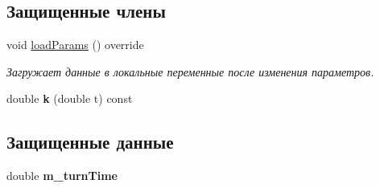\subsection*{Защищенные члены}
\begin{DoxyCompactItemize}
\item 
void \hyperlink{class_tasks_1_1_continuous_discrete_1_1_landing_linear_a1845731f06868b6a22cbd7184e0358ff}{load\+Params} () override\hypertarget{class_tasks_1_1_continuous_discrete_1_1_landing_linear_a1845731f06868b6a22cbd7184e0358ff}{}\label{class_tasks_1_1_continuous_discrete_1_1_landing_linear_a1845731f06868b6a22cbd7184e0358ff}

\begin{DoxyCompactList}\small\item\em Загружает данные в локальные переменные после изменения параметров. \end{DoxyCompactList}\item 
double {\bfseries k} (double t) const \hypertarget{class_tasks_1_1_continuous_discrete_1_1_landing_linear_a6fc909fe9a58a038714138081a246295}{}\label{class_tasks_1_1_continuous_discrete_1_1_landing_linear_a6fc909fe9a58a038714138081a246295}

\end{DoxyCompactItemize}
\subsection*{Защищенные данные}
\begin{DoxyCompactItemize}
\item 
double {\bfseries m\+\_\+turn\+Time}\hypertarget{class_tasks_1_1_continuous_discrete_1_1_landing_linear_a838994e67eb175e03da8e736d5c00910}{}\label{class_tasks_1_1_continuous_discrete_1_1_landing_linear_a838994e67eb175e03da8e736d5c00910}

\end{DoxyCompactItemize}
